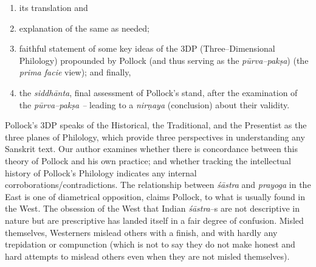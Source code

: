 {\begin{enumerate}
 \item its translation and

 \item explanation of the same as needed;

 \item faithful statement of some key ideas of the 3DP (Three–Dimensional Philology) propounded by Pollock (and thus serving as the \textit{pūrva–pakṣa}) (the \textit{prima facie} view); and finally,

 \item the \textit{siddhānta}, final assessment of Pollock’s stand, after the examination of the \textit{pūrva–pakṣa –} leading to a \textit{nirṇaya} (conclusion) about their validity.

\end{enumerate}

Pollock’s 3DP speaks of the Historical, the Traditional, and the Presentist as the three planes of Philology, which provide three perspectives in understanding any Sanskrit text. Our author examines whether there is concordance between this theory of Pollock and his own practice; and whether tracking the intellectual history of Pollock’s Philology indicates any internal corroborations/contradictions. The relationship between \textit{śāstra} and \textit{prayoga} in the East is one of diametrical opposition, claims Pollock, to what is usually found in the West. The obsession of the West that Indian \textit{śāstra}–s are not descriptive in nature but are prescriptive has landed itself in a fair degree of confusion. Misled themselves, Westerners mislead others with a finish, and with hardly any trepidation or compunction (which is not to say they do not make honest and hard attempts to mislead others even when they are not misled themselves).

}
